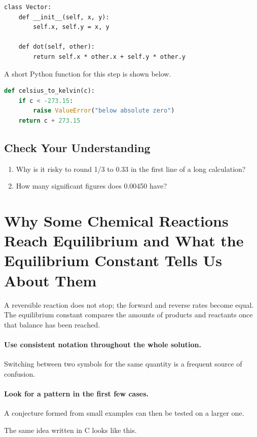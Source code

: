 \documentclass[11pt]{article}
\begin{document}
{\small\begin{verbatim}
class Vector:
    def __init__(self, x, y):
        self.x, self.y = x, y

    def dot(self, other):
        return self.x * other.x + self.y * other.y
\end{verbatim}}

A short Python function for this step is shown below.

\begin{lstlisting}[language=Python]
def celsius_to_kelvin(c):
    if c < -273.15:
        raise ValueError("below absolute zero")
    return c + 273.15
\end{lstlisting}

\subsection*{Check Your Understanding}
\begin{enumerate}
\item Why is it risky to round 1/3 to 0.33 in the first line of a long calculation?
\item How many significant figures does 0.00450 have?
\end{enumerate}

\section{Why Some Chemical Reactions Reach Equilibrium and What the Equilibrium Constant Tells Us About Them}

A reversible reaction does not stop; the forward and reverse rates become equal. The equilibrium constant compares the amounts of products and reactants once that balance has been reached.

\paragraph{Use consistent notation throughout the whole solution.} Switching between two symbols for the same quantity is a frequent source of confusion.

\paragraph{Look for a pattern in the first few cases.} A conjecture formed from small examples can then be tested on a larger one.

The same idea written in C looks like this.
\end{document}
